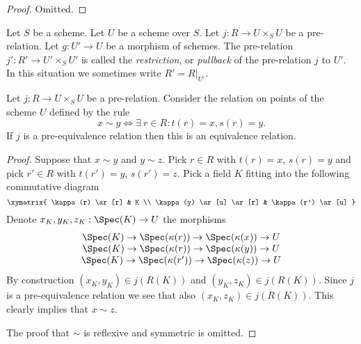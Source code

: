\begin{proof}
Omitted.
\end{proof}

\begin{definition}
\label{definition-restrict-relation}
Let $S$ be a scheme.
Let $U$ be a scheme over $S$.
Let $j : R \to U \times_S U$ be a pre-relation.
Let $g : U' \to U$ be a morphism of schemes.
The pre-relation $j' : R' \to U' \times_S U'$ is called
the {\it restriction}, or {\it pullback} of the pre-relation $j$ to $U'$.
In this situation we sometimes write $R' = R|_{U'}$.
\end{definition}

\begin{lemma}
\label{lemma-pre-equivalence-equivalence-relation-points}
Let $j : R \to U \times_S U$ be a pre-relation.
Consider the relation on points of the scheme $U$ defined by
the rule
$$
x \sim y
\Leftrightarrow
\exists\ r \in R :
t(r) = x,
s(r) = y.
$$
If $j$ is a pre-equivalence relation then this is an
equivalence relation.
\end{lemma}

\begin{proof}
Suppose that $x \sim y$ and $y \sim z$.
Pick $r \in R$ with $t(r) = x$, $s(r) = y$ and
pick $r' \in R$ with $t(r') = y$, $s(r') = z$.
Pick a field $K$ fitting into the following commutative
diagram
$$
\xymatrix{
\kappa(r) \ar[r] & K \\
\kappa(y) \ar[u] \ar[r] & \kappa(r') \ar[u]
}
$$
Denote $x_K, y_K, z_K : \Spec(K) \to U$
the morphisms
$$
\begin{matrix}
\Spec(K) \to \Spec(\kappa(r))
\to
\Spec(\kappa(x)) \to U \\
\Spec(K) \to \Spec(\kappa(r))
\to
\Spec(\kappa(y)) \to U \\
\Spec(K) \to \Spec(\kappa(r'))
\to
\Spec(\kappa(z)) \to U
\end{matrix}
$$
By construction $(x_K, y_K) \in j(R(K))$ and
$(y_K, z_K) \in j(R(K))$. Since $j$ is a pre-equivalence relation
we see that also $(x_K, z_K) \in j(R(K))$.
This clearly implies that $x \sim z$.

\medskip\noindent
The proof that $\sim$ is reflexive and symmetric is omitted.
\end{proof}

